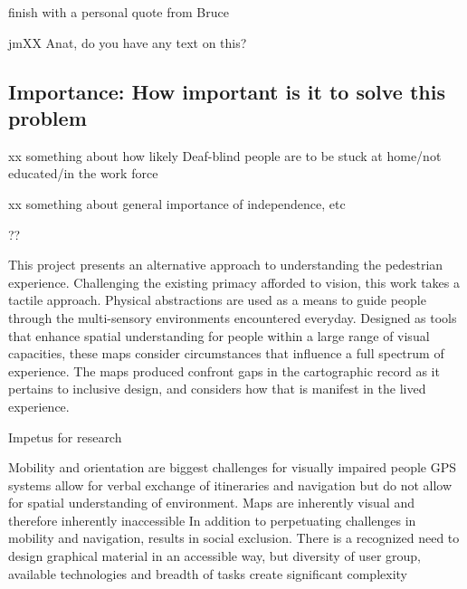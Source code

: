 \ac{finish with a personal quote from Bruce}



jm{XX Anat, do you have any text on this?}

\subsection{Importance: How important is it to solve this problem }


xx something about how likely Deaf-blind people are to be stuck at home/not educated/in the work force

xx something about general importance of independence, etc

??


This project presents an alternative approach to understanding the pedestrian experience. Challenging the existing primacy afforded to vision, this work takes a tactile approach. Physical abstractions are used as a means to guide people through the multi-sensory environments encountered everyday. Designed as tools that enhance spatial understanding for people within a large range of visual capacities, these maps consider circumstances that influence a full spectrum of experience. The maps produced confront gaps in the cartographic record as it pertains to inclusive design, and considers how that is manifest in the lived experience.

Impetus for research 

\ac{Mobility and orientation are biggest challenges for visually impaired people
GPS systems allow for verbal exchange of itineraries and navigation but do not allow for spatial understanding of environment. 
Maps are inherently visual and therefore inherently inaccessible
In addition to perpetuating challenges in mobility and navigation, results in social exclusion. There is a recognized need to design graphical material in an accessible way, but diversity of user group, available technologies and breadth of tasks create significant complexity 
}
